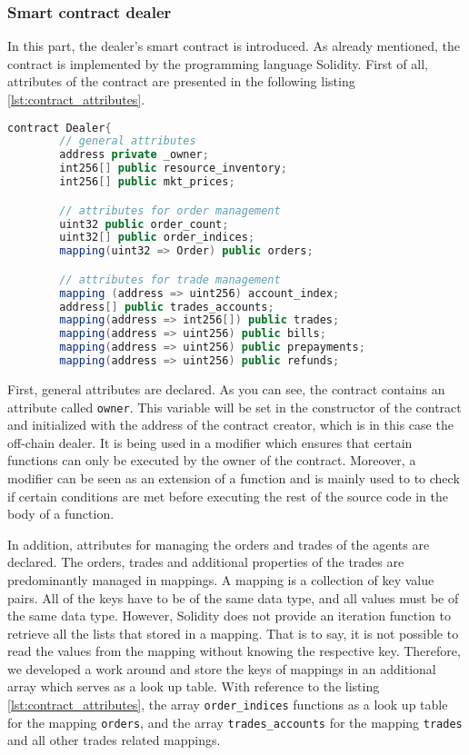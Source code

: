 \subsubsection{Smart contract dealer}

In this part, the dealer's smart contract is introduced. 
As already mentioned, the contract is implemented by the programming language Solidity. 
First of all, attributes of the contract are presented in the following listing \ref{lst:contract_attributes}.

\begin{lstlisting}[float=htbp, label=lst:contract_attributes, caption=Attributes of Smart Contract, language=Java]
    contract Dealer{
        // general attributes
        address private _owner;
        int256[] public resource_inventory;
        int256[] public mkt_prices;

        // attributes for order management
        uint32 public order_count;
        uint32[] public order_indices;
        mapping(uint32 => Order) public orders;

        // attributes for trade management
        mapping (address => uint256) account_index; 
        address[] public trades_accounts;
        mapping(address => int256[]) public trades;
        mapping(address => uint256) public bills;
        mapping(address => uint256) public prepayments;
        mapping(address => uint256) public refunds;
\end{lstlisting}

First, general attributes are declared. As you can see, the contract contains an attribute called \verb|owner|.
This variable will be set in the constructor of the contract and initialized with the address of the contract creator,
which is in this case the off-chain dealer.  
It is being used in a modifier which ensures that certain functions can only be executed by the owner of the contract.
Moreover, a modifier can be seen as an extension of a function and is mainly used to 
to check if certain conditions are met before executing the rest of the source code in the body of a function.

In addition, attributes for managing the orders and trades of the agents are declared. 
The orders, trades and additional properties of the trades are predominantly managed in mappings.
A mapping is a collection of key value pairs. All of the keys have to be of the same data type, and 
all values must be of the same data type. However, Solidity does not provide an iteration
function to retrieve all the lists that stored in a mapping. 
That is to say, it is not possible to read the values from the mapping without knowing the respective key.
Therefore, we developed a work around and store the keys of mappings in an additional array which serves 
as a look up table.
With reference to the listing \ref{lst:contract_attributes}, the array \verb|order_indices| functions as a 
look up table for the mapping \verb|orders|, and the array \verb|trades_accounts| for the mapping 
\verb|trades| and all other trades related mappings.

